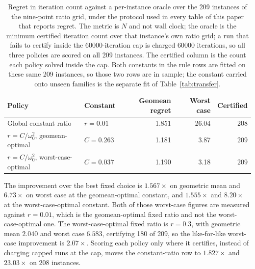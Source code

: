 \begin{table}[t]
\centering
\caption{Regret in iteration count against a per-instance oracle over the 209
instances of the nine-point ratio grid, under the protocol used in every table
of this paper that reports regret. The metric is $N$ and not wall clock; the
oracle is the minimum certified iteration count over that instance's own ratio
grid; a run that fails to certify inside the 60000-iteration cap is charged
60000 iterations, so all three policies are scored on all 209 instances. The
certified column is the count each policy solved inside the cap. Both constants
in the rule rows are fitted on these same 209 instances, so those two rows are
in sample; the constant carried onto unseen families is the separate fit of
Table~\ref{tab:transfer}.}
\label{tab:regret}
\begin{tabular}{@{}llrrr@{}}
\toprule
Policy & Constant & Geomean regret & Worst case & Certified \\
\midrule
Global constant ratio      & $r = 0.01$   & 1.851 & 26.04 & 208 \\
$r = C / \omega_0^2$, geomean-optimal & $C = 0.263$  & 1.181 & 3.87 & 209 \\
$r = C / \omega_0^2$, worst-case-optimal & $C = 0.037$ & 1.190 & 3.18 & 209 \\
\bottomrule
\end{tabular}
\end{table}

The improvement over the best fixed choice is $1.567\times$ on geometric mean
and $6.73\times$ on worst case at the geomean-optimal constant, and
$1.555\times$ and $8.20\times$ at the worst-case-optimal constant. Both of
those worst-case figures are measured against $r = 0.01$, which is the
geomean-optimal fixed ratio and not the worst-case-optimal one. The
worst-case-optimal fixed ratio is $r = 0.3$, with geometric mean $2.040$ and
worst case $6.583$, certifying 180 of 209, so the like-for-like worst-case
improvement is $2.07\times$. Scoring each policy only where it certifies,
instead of charging capped runs at the cap, moves the constant-ratio row to
$1.827\times$ and $23.03\times$ on 208 instances.

